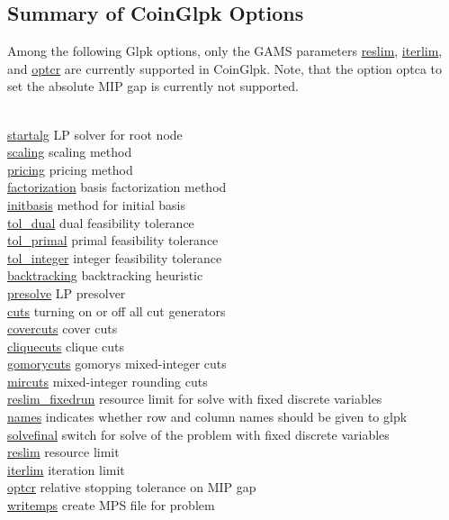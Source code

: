 \subsection{Summary of CoinGlpk Options}

Among the following Glpk options, only the GAMS parameters \hyperlink{glpkreslim}{reslim}, \hyperlink{glpkiterlim}{iterlim}, and \hyperlink{glpkoptcr}{optcr} are currently supported in CoinGlpk.
Note, that the option optca to set the absolute MIP gap is currently not supported.

\begin{tabbing}
\hspace {1.0in} \= \\
\hyperlink{glpkstartalg}
{startalg} \> LP solver for root node \\
\hyperlink{glpkscaling}
{scaling} \> scaling method \\
\hyperlink{pricing}
{pricing} \> pricing method \\
\hyperlink{factorization}
{factorization} \> basis factorization method \\
\hyperlink{initbasis}
{initbasis} \> method for initial basis \\
\hyperlink{glpktol_dual}
{tol\_dual} \> dual feasibility tolerance \\
\hyperlink{glpktol_primal}
{tol\_primal} \> primal feasibility tolerance \\
\hyperlink{glpktol_integer}
{tol\_integer} \> integer feasibility tolerance \\
\hyperlink{backtracking}
{backtracking} \> backtracking heuristic \\
\hyperlink{glpkpresolve}
{presolve} \> LP presolver \\
\hyperlink{glpkcuts}
{cuts} \> turning on or off all cut generators \\
\hyperlink{glpkcovercuts}
{covercuts} \> cover cuts \\
\hyperlink{glpkcliquecuts}
{cliquecuts} \> clique cuts \\
\hyperlink{glpkgomorycuts}
{gomorycuts} \> gomorys mixed-integer cuts \\
\hyperlink{glpkmircuts}
{mircuts} \> mixed-integer rounding cuts \\
\hyperlink{reslim_fixedrun}
{reslim\_fixedrun} \> resource limit for solve with fixed discrete variables \\
\hyperlink{glpknames}
{names} \> indicates whether row and column names should be given to glpk \\
\hyperlink{glpksolvefinal}
{solvefinal} \> switch for solve of the problem with fixed discrete variables \\
\hyperlink{glpkreslim}
{reslim} \> resource limit \\
\hyperlink{glpkiterlim}
{iterlim} \> iteration limit \\
\hyperlink{glpkoptcr}
{optcr} \> relative stopping tolerance on MIP gap \\
\hyperlink{glpkwritemps}
{writemps} \> create MPS file for problem
\end{tabbing}

